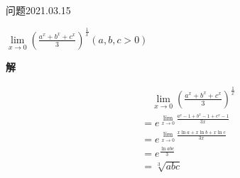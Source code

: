 \begin{mybox}{问题2021.03.15}
	
	\qquad $\lim\limits_{x \to 0}(\frac{a^x+b^x+c^x}{3})^{\frac{1}{x}}(a,b,c>0)$
\end{mybox}
\noindent
\textbf{解}

\begin{align*}
	&\quad\lim\limits_{x \to 0}(\frac{a^x+b^x+c^x}{3})^{\frac{1}{x}}\\
	&=e^{\lim \limits_{x \to 0} \frac{a^x-1+b^x-1+c^x-1}{3x}}\\
	&=e^{\lim \limits_{x \to 0} \frac{x\ln a+ x\ln b+x\ln c}{3x}}\\
	&=e^{\frac{\ln abc}{3}}\\
	&=\sqrt[3]{abc}
\end{align*}